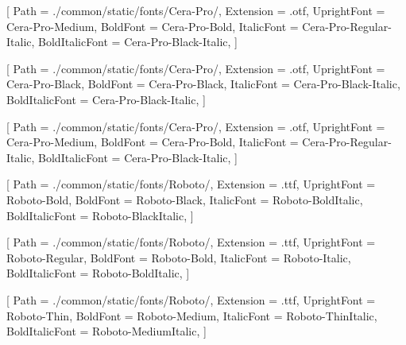 
\contourlength{0.8pt}

\renewcommand{\ULdepth}{3.8pt}

\setmainfont{Cera-Pro-Medium}[
Path = ./common/static/fonts/Cera-Pro/,
Extension = .otf,
UprightFont = Cera-Pro-Medium,
BoldFont = Cera-Pro-Bold,
ItalicFont = Cera-Pro-Regular-Italic,
BoldItalicFont = Cera-Pro-Black-Italic,
]


[
Path = ./common/static/fonts/Cera-Pro/,
Extension = .otf,
UprightFont = Cera-Pro-Black,
BoldFont = Cera-Pro-Black,
ItalicFont = Cera-Pro-Black-Italic,
BoldItalicFont = Cera-Pro-Black-Italic,
]

[
Path = ./common/static/fonts/Cera-Pro/,
Extension = .otf,
UprightFont = Cera-Pro-Medium,
BoldFont = Cera-Pro-Bold,
ItalicFont = Cera-Pro-Regular-Italic,
BoldItalicFont = Cera-Pro-Black-Italic,
]

[
Path = ./common/static/fonts/Roboto/,
Extension = .ttf,
UprightFont = Roboto-Bold,
BoldFont = Roboto-Black,
ItalicFont = Roboto-BoldItalic,
BoldItalicFont = Roboto-BlackItalic,
]

[
Path = ./common/static/fonts/Roboto/,
Extension = .ttf,
UprightFont = Roboto-Regular,
BoldFont = Roboto-Bold,
ItalicFont = Roboto-Italic,
BoldItalicFont = Roboto-BoldItalic,
]

[
Path = ./common/static/fonts/Roboto/,
Extension = .ttf,
UprightFont = Roboto-Thin,
BoldFont = Roboto-Medium,
ItalicFont = Roboto-ThinItalic,
BoldItalicFont = Roboto-MediumItalic,
]